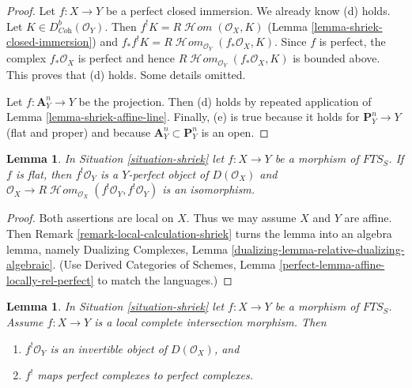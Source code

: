 \documentclass{stacks-project}
\theoremstyle{plain}
\newtheorem{lemma}[subsection]{Lemma}
\theoremstyle{definition}
\theoremstyle{remark}
\numberwithin{equation}{subsection}
\def\SheafHom{\mathop{\mathcal{H}\!\mathit{om}}\nolimits}
\begin{document}
\begin{proof}
\medskip\noindent
Let $f : X \to Y$ be a perfect closed immersion. We already know (d) holds.
Let $K \in D^b_{\textit{Coh}}(\mathcal{O}_Y)$.
Then $f^!K = R\SheafHom(\mathcal{O}_X, K)$
(Lemma \ref{lemma-shriek-closed-immersion})
and $f_*f^!K = R\SheafHom_{\mathcal{O}_Y}(f_*\mathcal{O}_X, K)$.
Since $f$ is perfect, the complex $f_*\mathcal{O}_X$ is perfect
and hence $R\SheafHom_{\mathcal{O}_Y}(f_*\mathcal{O}_X, K)$ is bounded above.
This proves that (d) holds. Some details omitted.

\medskip\noindent
Let $f : \mathbf{A}^n_Y \to Y$ be the projection. Then (d) holds
by repeated application of Lemma \ref{lemma-shriek-affine-line}.
Finally, (e) is true because it holds for $\mathbf{P}^n_Y \to Y$
(flat and proper) and because $\mathbf{A}^n_Y \subset \mathbf{P}^n_Y$
is an open.
\end{proof}

\begin{lemma}
\label{lemma-flat-shriek-relatively-perfect}
In Situation \ref{situation-shriek} let $f : X \to Y$ be a morphism of
$\textit{FTS}_S$. If $f$ is flat, then
$f^!\mathcal{O}_Y$ is a $Y$-perfect object of $D(\mathcal{O}_X)$ and
$\mathcal{O}_X \to
R\SheafHom_{\mathcal{O}_X}(f^!\mathcal{O}_Y, f^!\mathcal{O}_Y)$
is an isomorphism.
\end{lemma}

\begin{proof}
Both assertions are local on $X$. Thus we may assume $X$ and $Y$ are
affine. Then Remark \ref{remark-local-calculation-shriek}
turns the lemma into an algebra lemma, namely
Dualizing Complexes, Lemma \ref{dualizing-lemma-relative-dualizing-algebraic}.
(Use Derived Categories of Schemes, Lemma
\ref{perfect-lemma-affine-locally-rel-perfect} to match the languages.)
\end{proof}

\begin{lemma}
\label{lemma-lci-shriek}
In Situation \ref{situation-shriek} let $f : X \to Y$ be a morphism of
$\textit{FTS}_S$. Assume $f : X \to Y$ is a local complete
intersection morphism. Then
\begin{enumerate}
\item $f^!\mathcal{O}_Y$ is an invertible object of $D(\mathcal{O}_X)$, and
\item $f^!$ maps perfect complexes to perfect complexes.
\end{enumerate}
\end{lemma}
\end{document}
